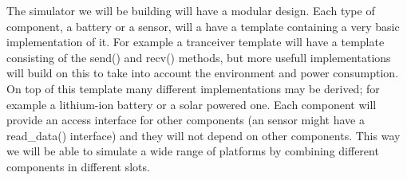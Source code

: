 \label{subsec:architecture}

The simulator we will be building will have a modular design. Each type
of component, a battery or a sensor, will a have a template containing a
very basic implementation of it. For example a tranceiver template will
have a template consisting of the send() and recv() methods, but more
usefull implementations will build on this to take into account the
environment and power consumption. On top of this template many different
implementations may be derived; for example a lithium-ion battery or a solar
powered one. Each component will provide an access interface for other components
(an sensor might have a read_data() interface) and they will not depend on other 
components. This way we will be able to simulate a wide range of platforms by
combining different components in different slots.
